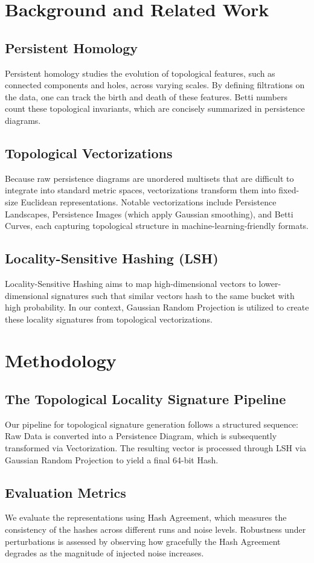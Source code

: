\documentclass[10pt, conference]{IEEEtran}
\begin{document}
\section{Background and Related Work}
\subsection{Persistent Homology}
Persistent homology studies the evolution of topological features, such as connected components and holes, across varying scales. By defining filtrations on the data, one can track the birth and death of these features. Betti numbers count these topological invariants, which are concisely summarized in persistence diagrams.
\subsection{Topological Vectorizations}
Because raw persistence diagrams are unordered multisets that are difficult to integrate into standard metric spaces, vectorizations transform them into fixed-size Euclidean representations. Notable vectorizations include Persistence Landscapes, Persistence Images (which apply Gaussian smoothing), and Betti Curves, each capturing topological structure in machine-learning-friendly formats.
\subsection{Locality-Sensitive Hashing (LSH)}
Locality-Sensitive Hashing aims to map high-dimensional vectors to lower-dimensional signatures such that similar vectors hash to the same bucket with high probability. In our context, Gaussian Random Projection is utilized to create these locality signatures from topological vectorizations.

\section{Methodology}
\subsection{The Topological Locality Signature Pipeline}
Our pipeline for topological signature generation follows a structured sequence: Raw Data is converted into a Persistence Diagram, which is subsequently transformed via Vectorization. The resulting vector is processed through LSH via Gaussian Random Projection to yield a final 64-bit Hash.
\subsection{Evaluation Metrics}
We evaluate the representations using Hash Agreement, which measures the consistency of the hashes across different runs and noise levels. Robustness under perturbations is assessed by observing how gracefully the Hash Agreement degrades as the magnitude of injected noise increases.
\end{document}
